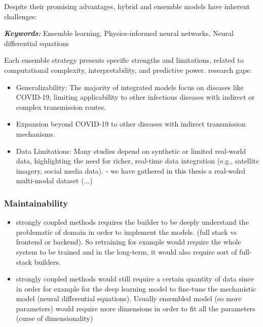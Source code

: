Despite their promising advantages, hybrid and ensemble models have inherent challenges:

\textit{\textbf{Keywords:}} Ensemble learning, Physics-informed neural networks, Neural differential equations


Each ensemble strategy presents specific strengths and limitations, related to computational complexity, interpretability, and predictive power. 
research gaps:
\begin{itemize}
    \item Generalizability: The majority of integrated models focus on diseases like COVID-19, limiting applicability to other infectious diseases with indirect or complex transmission routes.
    \item Expansion beyond COVID-19 to other diseases with indirect transmission mechanisms.
    \item Data Limitations: Many studies depend on synthetic or limited real-world data, highlighting the need for richer, real-time data integration (e.g., satellite imagery, social media data). - we have gathered in this thesis a real-wolrd multi-modal dataset (...)
\end{itemize}

\subsubsection{Maintainability}

    \begin{itemize}
        \item strongly coupled methods requires the builder to be deeply understand the problematic of domain in order to implement the models. (full stack vs frontend or backend). So retraining for example would require the whole system to be trained and in the long-term, it would also require sort of full-stack builders. 
        
        \item strongly coupled methods would still require a  certain quantity of data since in order for example for the deep learning model to fine-tune the mechanistic model (neural differential equations). Usually ensembled model (so more parameters) would require more dimensions in order to fit all the parameters (curse of dimensionality)
    \end{itemize}


